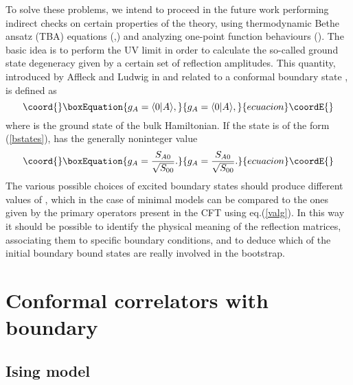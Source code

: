 \documentclass[a4paper,12pt]{report}
\begin{document}
To solve these problems, we intend to proceed in the future work performing indirect checks on certain properties
of the theory, using thermodynamic Bethe ansatz (TBA) equations (\cite{TBA1},\cite{TBA2}) and analyzing one-point
function behaviours (\cite{FF}). The basic idea is to perform the UV limit in order to calculate the so-called
ground state degeneracy \coordHE{} given by a certain set of reflection amplitudes. This quantity, introduced by Affleck
and Ludwig in \cite{affllud} and related to a conformal boundary state \coordHE{}, is defined as
\begin{equation}\coord{}\boxEquation{\label{g}
g_{A}=\langle 0|A\rangle,
}{g_{A}=\langle 0|A\rangle,
}{ecuacion}\coordE{}\end{equation}
where \myHighlight{$|0\rangle$}\coordHE{} is the ground state of the bulk Hamiltonian. If the state \coordHE{} is of the form
(\ref{bstates}), \coordHE{} has the generally noninteger value
\begin{equation}\coord{}\boxEquation{\label{valg}
g_{A}=\frac{S_{A0}}{\sqrt{S_{00}}}.
}{g_{A}=\frac{S_{A0}}{\sqrt{S_{00}}}.
}{ecuacion}\coordE{}\end{equation}
The various possible choices of excited boundary states should produce different values of \coordHE{}, which in the case
of minimal models can be compared to the ones given by the primary operators present in the CFT using
eq.(\ref{valg}). In this way it should be possible to identify the physical meaning of the reflection matrices,
associating them to specific boundary conditions, and to deduce which of the initial boundary bound states are
really involved in the bootstrap.




\newpage

\appendix

\chapter{Conformal correlators with boundary}
\label{confcalc}

\section{Ising model}
\end{document}
